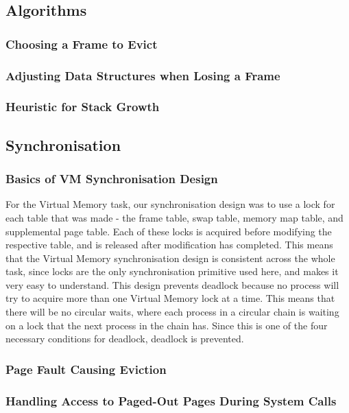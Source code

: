 \documentclass{article}
\renewcommand{\_}{\char`_}
\begin{document}
\subsection{Algorithms}

\subsubsection{Choosing a Frame to Evict}

\subsubsection{Adjusting Data Structures when Losing a Frame}

\subsubsection{Heuristic for Stack Growth}

\subsection{Synchronisation}

\subsubsection{Basics of VM Synchronisation Design}

For the Virtual Memory task, our synchronisation design was to use a lock for each table that was made - the frame table, swap table, memory map table, and supplemental page table. Each of these locks is acquired before modifying the respective table, and is released after modification has completed. This means that the Virtual Memory synchronisation design is consistent across the whole task, since locks are the only synchronisation primitive used here, and makes it very easy to understand. This design prevents deadlock because no process will try to acquire more than one Virtual Memory lock at a time. This means that there will be no circular waits, where each process in a circular chain is waiting on a lock that the next process in the chain has. Since this is one of the four necessary conditions for deadlock, deadlock is prevented.

\subsubsection{Page Fault Causing Eviction}

\subsubsection{Handling Access to Paged-Out Pages During System Calls}
\end{document}
